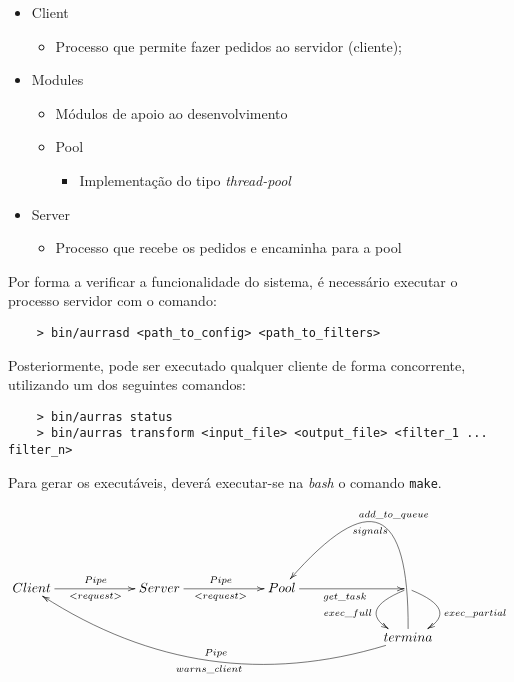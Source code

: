 \documentclass[11pt]{article}
\begin{document}
\begin{itemize}
    \item Client
          \begin{itemize}
              \item Processo que permite fazer pedidos ao servidor (cliente);
          \end{itemize}
    \item Modules
          \begin{itemize}
              \item Módulos de apoio ao desenvolvimento
              \item Pool
                    \begin{itemize}
                        \item Implementação do tipo \textit{thread-pool}
                    \end{itemize}
          \end{itemize}
    \item Server
          \begin{itemize}
              \item Processo que recebe os pedidos e encaminha para a pool
          \end{itemize}
\end{itemize}

Por forma a verificar a funcionalidade do sistema, é necessário executar o processo servidor com o comando:
\begin{verbatim}
    > bin/aurrasd <path_to_config> <path_to_filters>
\end{verbatim}

Posteriormente, pode ser executado qualquer cliente de forma concorrente, utilizando um dos seguintes comandos:
\begin{verbatim}
    > bin/aurras status
    > bin/aurras transform <input_file> <output_file> <filter_1 ... filter_n>
\end{verbatim}

Para gerar os executáveis, deverá executar-se na \textit{bash} o comando \texttt{make}.

\begin{equation*}
    \xymatrixcolsep{5pc}\xymatrix {
    Client\ar[r]_{<request>}^{Pipe} & Server\ar[r]_{<request>}^{Pipe} & Pool\ar[r]_{get\_task} &\ar@/_2pc/[d]_{exec\_full}\ar@/^2pc/[d]^{exec\_partial}\\
    & & & termina\ar@/^3pc/[ulll]^{warns\_client}_{Pipe} \ar@/_6pc/[ul]_{add\_to\_queue}^{signals}
    }
\end{equation*}
\end{document}
